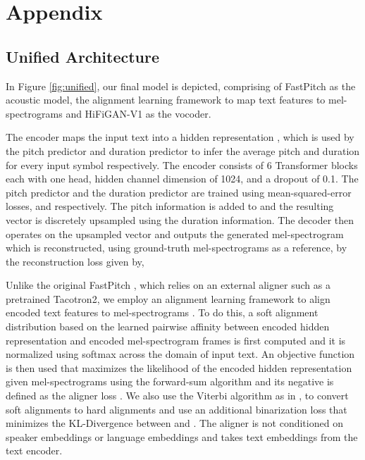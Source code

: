 \documentclass{article}
\begin{document}
\newpage
\appendix
\section{Appendix}
\subsection{Unified Architecture}
\label{appendix:unified}


In Figure \ref{fig:unified}, our final model is depicted, comprising of FastPitch \cite{lancucki2021fastpitch} as the acoustic model, the alignment learning framework \cite{badlani2022one} to map text features to mel-spectrograms and HiFiGAN-V1 \cite{kong2020hifi} as the vocoder.

 The encoder maps the input text into a hidden representation , which is used by the pitch predictor and duration predictor to infer the average pitch and duration for every input symbol respectively. The encoder consists of 6 Transformer blocks each with one head, hidden channel dimension of 1024, and a dropout of 0.1. The pitch predictor and the duration predictor are trained using mean-squared-error losses,  and  respectively. The pitch information is added to  and the resulting vector is discretely upsampled using the duration information. The decoder then operates on the upsampled vector and outputs the generated mel-spectrogram  which is reconstructed, using ground-truth mel-spectrograms  as a reference, by the reconstruction loss  given by,


 Unlike the original FastPitch \cite{lancucki2021fastpitch}, which relies on an external aligner such as a pretrained Tacotron2, we employ an alignment learning framework \cite{badlani2022one} to align encoded text features  to mel-spectrograms . To do this, a soft alignment distribution 
based on the learned pairwise affinity between encoded hidden representation 
and encoded mel-spectrogram frames is first computed and it is normalized using softmax across the domain of input text. An objective function is then used that maximizes the likelihood of the encoded hidden representation given mel-spectrograms using the forward-sum algorithm and its negative is defined as the aligner loss . We also use the Viterbi algorithm as in \cite{badlani2022one}, to convert soft alignments  to hard alignments  and use an additional binarization loss  that minimizes the KL-Divergence between  and . The aligner is not conditioned on speaker embeddings or language embeddings and takes text embeddings from the text encoder.
\end{document}

